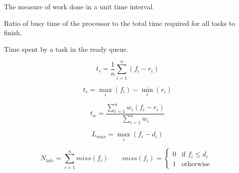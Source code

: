 \begin{definition}[Throughput]
The measure of work done in a unit time interval.
\end{definition}

\begin{definition}[Utilization]
Ratio of busy time of the processor to the total time required for all tasks to finish.
\end{definition}

\begin{definition}
Time spent by a task in the ready queue.
\end{definition}


\begin{definition}
\begin{equation} 
t_r = \frac{1}{n} \sum\limits_{i = 1}^{n}(f_i - r_i) 
\end{equation}
\end{definition}

\begin{definition}
\begin{equation}
t_c = \max_i (f_i) - \min_i ( r_i)
\end{equation}
\end{definition}

\begin{definition}
\begin{equation}
t_w = \frac{ \sum\limits_{i = 1}^{n}w_i(f_i - r_i) }{\sum\limits_{i = 1}^{n} w_i}
\end{equation}
\end{definition}

\begin{definition} 
\begin{equation}
L_{max} = \max_i(f_i - d_i)
\end{equation}
\end{definition}

\begin{definition}

\begin{equation}
 { N_{late} = \sum\limits_{i = 1}^{n} miss(f_i)  }	\qquad
 { miss(f_i) = \left\{
	\begin{array}{ll}
		0  & \mbox{if } f_i \leq d_i \\
		1 & \mbox{otherwise }
	\end{array}
\right.
}
\end{equation}

\end{definition}



\cleardoublepage